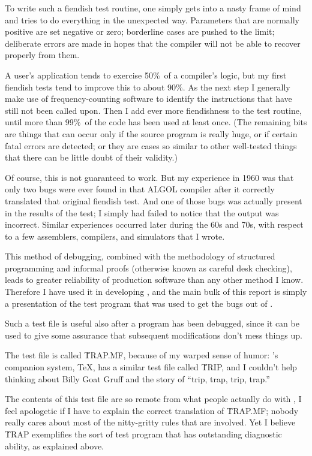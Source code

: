 To write such a fiendish test routine, one simply gets into a nasty frame
of mind and tries to do everything in the unexpected way. Parameters
that are normally positive are set negative or zero; borderline cases
are pushed to the limit; deliberate errors are made in hopes that the
compiler will not be able to recover properly from them.

A user's application tends to exercise 50\%\ of a compiler's logic,
but my first fiendish tests tend to improve this to about 90\%. As the
next step I generally make use of frequency-counting software to identify
the instructions that have still not been called upon. Then I add ever more
fiendishness to the test routine, until more than 99\%\ of the code
has been used at least once. (The remaining bits are things that
can occur only if the source program is really huge, or if certain
fatal errors are detected; or they are cases so similar to other well-tested
things that there can be little doubt of their validity.)

Of course, this is not guaranteed to work. But my experience in 1960 was
that only two bugs were ever found in that {\mc ALGOL} compiler after it
correctly translated that original fiendish test. And one of those bugs
was actually present in the results of the test; I simply had failed to
notice that the output was incorrect. Similar experiences occurred later
during the 60s and 70s, with respect to a few assemblers, compilers,
and simulators that I wrote.

This method of debugging, combined with the methodology of structured
programming and informal proofs (otherwise known as careful desk checking),
leads to greater reliability of production software than any other
method I know. Therefore I have used it in developing , and the
main bulk of this report is simply a presentation of the test program
that was used to get the bugs out of \MF.

Such a test file is useful also after a program has been debugged, since
it can be used to give some assurance that subsequent modifications don't
mess things up.

The test file is called \.{TRAP.MF}, because of my warped sense of humor:
\MF's companion system, \TeX, has a similar test file called \.{TRIP}, and I
couldn't help thinking about Billy Goat Gruff and the story of ``trip,
trap, trip, trap.''

The contents of this test file are so remote from what people actually
do with \MF, I feel apologetic if I have to explain the correct
translation of \.{TRAP.MF}; nobody really cares about most of the
nitty-gritty rules that are involved. Yet I believe \.{TRAP} exemplifies
the sort of test program that has outstanding diagnostic ability, as
explained above.

